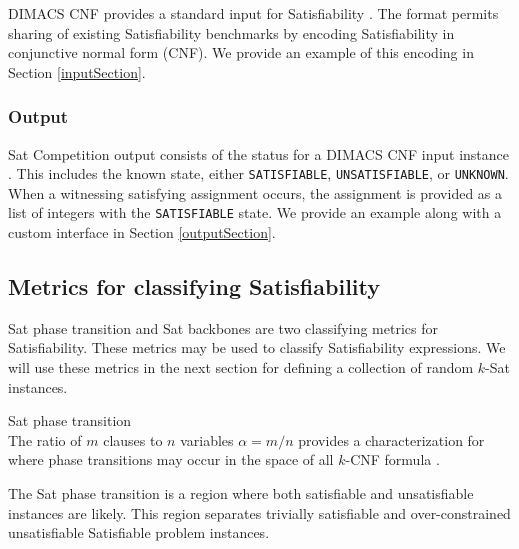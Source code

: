 DIMACS CNF provides a standard input for {\sc Satisfiability} \cite{dimacsFormat}.  The format permits sharing of existing {\sc Satisfiability} benchmarks by encoding {\sc Satisfiability} in conjunctive normal form (CNF).  We provide an example of this encoding in Section \ref{inputSection}.
		
		\subsubsection{Output}
		

{\sc Sat} Competition output consists of the status for a DIMACS CNF input instance \cite{satcompetition}.  This includes the known state, either \texttt{SATISFIABLE}, \texttt{UNSATISFIABLE}, or \texttt{UNKNOWN}.  When a witnessing satisfying assignment occurs, the assignment is provided as a list of integers with the \texttt{SATISFIABLE} state.  We provide an example along with a custom interface in Section \ref{outputSection}.
	
	\subsection{Metrics for classifying {\sc Satisfiability}}

{\sc Sat} phase transition and {\sc Sat} backbones are two classifying metrics for {\sc Satisfiability}.  These metrics may be used to classify {\sc Satisfiability} expressions.  We will use these metrics in the next section for defining a collection of random $k$-{\sc Sat} instances.
		

\begin{definition}
{\sc Sat} phase transition\\
The ratio of $m$ clauses to $n$ variables $\alpha = m/n$ provides a characterization for where phase transitions may occur in the space of all $k$-CNF formula \cite{Doherty08thehandbook,Gent94thesat}.
\end{definition}

The {\sc Sat} phase transition is a region where both satisfiable and unsatisfiable instances are likely.  This region separates trivially satisfiable and over-constrained unsatisfiable {\sc Satisfiable} problem instances.  
		
